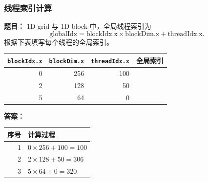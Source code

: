 \documentclass[10pt,a4paper]{article}
\begin{document}
\subsubsection{线程索引计算}
\noindent\textbf{题目：} 1D grid 与 1D block 中，全局线程索引为
\[
\mathrm{globalIdx}=\mathrm{blockIdx.x}\times\mathrm{blockDim.x}+\mathrm{threadIdx.x}.
\]
根据下表填写每个线程的全局索引。
\begin{center}
\small
\begin{tabular}{rrrr}
\toprule
\texttt{blockIdx.x} & \texttt{blockDim.x} & \texttt{threadIdx.x} & 全局索引 \\
\midrule
0 & 256 & 100 & \underline{\hspace{2.5em}} \\
2 & 128 & 50 & \underline{\hspace{2.5em}} \\
5 & 64 & 0 & \underline{\hspace{2.5em}} \\
\bottomrule
\end{tabular}
\end{center}
\noindent\textbf{答案：}
\begin{center}
\small
\begin{tabular}{rl}
\toprule
序号 & 计算过程 \\
\midrule
1 & $0\times256+100=100$ \\
2 & $2\times128+50=306$ \\
3 & $5\times64+0=320$ \\
\bottomrule
\end{tabular}
\end{center}
\end{document}
